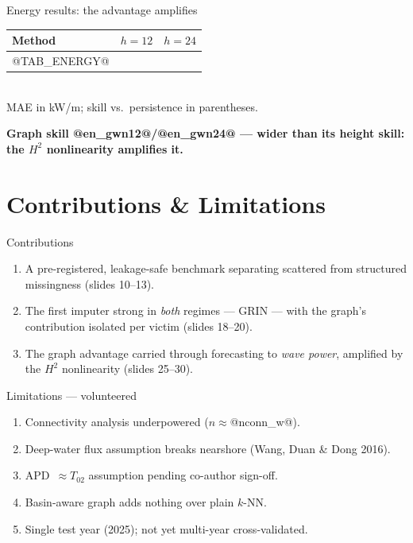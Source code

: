 \documentclass[aspectratio=169]{beamer}
\newcommand{\take}[1]{\vspace{0.6ex}\begin{center}\textbf{\color{colgraph}#1}\end{center}}
\begin{document}
\begin{frame}{Energy results: the advantage amplifies}
  \begin{center}
  \begin{tabular}{l cc}
    \toprule
    Method & $h{=}12$ & $h{=}24$\\
    \midrule
@TAB_ENERGY@
    \bottomrule
  \end{tabular}\\[0.5ex]
  {\footnotesize MAE in kW/m; skill vs.\ persistence in parentheses.}
  \end{center}
  \take{Graph skill @en_gwn12@/@en_gwn24@ --- wider than its height skill: the $H^2$ nonlinearity amplifies it.}
\end{frame}

\section{Contributions \& Limitations}

\begin{frame}{Contributions}
  \begin{enumerate}
    \item A pre-registered, leakage-safe benchmark separating scattered from structured missingness (slides 10--13).
    \item The first imputer strong in \emph{both} regimes --- GRIN --- with the graph's contribution isolated per victim (slides 18--20).
    \item The graph advantage carried through forecasting to \emph{wave power}, amplified by the $H^2$ nonlinearity (slides 25--30).
  \end{enumerate}
\end{frame}

\begin{frame}{Limitations --- volunteered}
  \begin{enumerate}\small
    \item Connectivity analysis underpowered ($n\approx$@nconn_w@).
    \item Deep-water flux assumption breaks nearshore (Wang, Duan \& Dong 2016).
    \item APD~$\approx T_{02}$ assumption pending co-author sign-off.
    \item Basin-aware graph adds nothing over plain $k$-NN.
    \item Single test year (2025); not yet multi-year cross-validated.
  \end{enumerate}
\end{frame}
\end{document}
